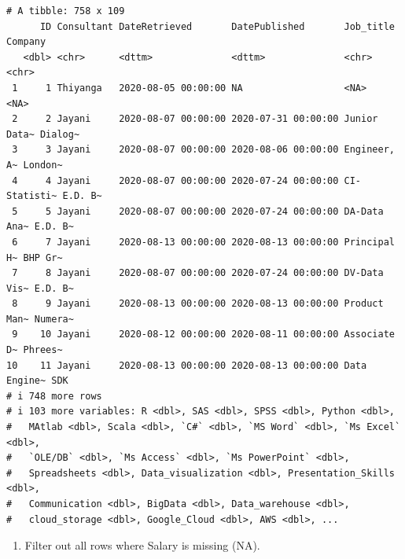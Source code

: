 \documentclass[
  letterpaper,
  DIV=11,
  numbers=noendperiod]{scrreprt}
\providecommand{\tightlist}{%
  \setlength{\itemsep}{0pt}\setlength{\parskip}{0pt}}\usepackage{longtable,booktabs,array}
\begin{document}
\begin{verbatim}
# A tibble: 758 x 109
      ID Consultant DateRetrieved       DatePublished       Job_title    Company
   <dbl> <chr>      <dttm>              <dttm>              <chr>        <chr>  
 1     1 Thiyanga   2020-08-05 00:00:00 NA                  <NA>         <NA>   
 2     2 Jayani     2020-08-07 00:00:00 2020-07-31 00:00:00 Junior Data~ Dialog~
 3     3 Jayani     2020-08-07 00:00:00 2020-08-06 00:00:00 Engineer, A~ London~
 4     4 Jayani     2020-08-07 00:00:00 2020-07-24 00:00:00 CI-Statisti~ E.D. B~
 5     5 Jayani     2020-08-07 00:00:00 2020-07-24 00:00:00 DA-Data Ana~ E.D. B~
 6     7 Jayani     2020-08-13 00:00:00 2020-08-13 00:00:00 Principal H~ BHP Gr~
 7     8 Jayani     2020-08-07 00:00:00 2020-07-24 00:00:00 DV-Data Vis~ E.D. B~
 8     9 Jayani     2020-08-13 00:00:00 2020-08-13 00:00:00 Product Man~ Numera~
 9    10 Jayani     2020-08-12 00:00:00 2020-08-11 00:00:00 Associate D~ Phrees~
10    11 Jayani     2020-08-13 00:00:00 2020-08-13 00:00:00 Data Engine~ SDK    
# i 748 more rows
# i 103 more variables: R <dbl>, SAS <dbl>, SPSS <dbl>, Python <dbl>,
#   MAtlab <dbl>, Scala <dbl>, `C#` <dbl>, `MS Word` <dbl>, `Ms Excel` <dbl>,
#   `OLE/DB` <dbl>, `Ms Access` <dbl>, `Ms PowerPoint` <dbl>,
#   Spreadsheets <dbl>, Data_visualization <dbl>, Presentation_Skills <dbl>,
#   Communication <dbl>, BigData <dbl>, Data_warehouse <dbl>,
#   cloud_storage <dbl>, Google_Cloud <dbl>, AWS <dbl>, ...
\end{verbatim}

\begin{enumerate}
\def\labelenumi{\arabic{enumi}.}
\setcounter{enumi}{10}
\tightlist
\item
  Filter out all rows where Salary is missing (NA).
\end{enumerate}
\end{document}
